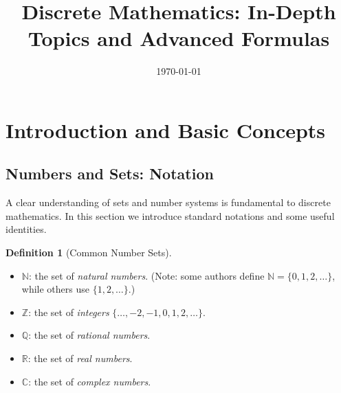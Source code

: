 \documentclass[12pt]{article}
\theoremstyle{definition}
\newtheorem{definition}[theorem]{Definition}
\begin{document}
\title{Discrete Mathematics: In-Depth Topics and Advanced Formulas}
\author{}
\date{\today}
\maketitle

\tableofcontents

\section{Introduction and Basic Concepts}

\subsection{Numbers and Sets: Notation}

A clear understanding of sets and number systems is fundamental to discrete mathematics. In this section we introduce standard notations and some useful identities.

\begin{definition}[Common Number Sets]
  \begin{itemize}[itemsep=3pt]
    \item \(\mathbb{N}\): the set of \emph{natural numbers}. (Note: some authors define \(\mathbb{N} = \{0,1,2,\dots\}\), while others use \(\{1,2,\dots\}\).)
    \item \(\mathbb{Z}\): the set of \emph{integers} \( \{ \dots, -2, -1, 0, 1, 2, \dots \}\).
    \item \(\mathbb{Q}\): the set of \emph{rational numbers}.
    \item \(\mathbb{R}\): the set of \emph{real numbers}.
    \item \(\mathbb{C}\): the set of \emph{complex numbers}.
  \end{itemize}
\end{definition}
\end{document}
